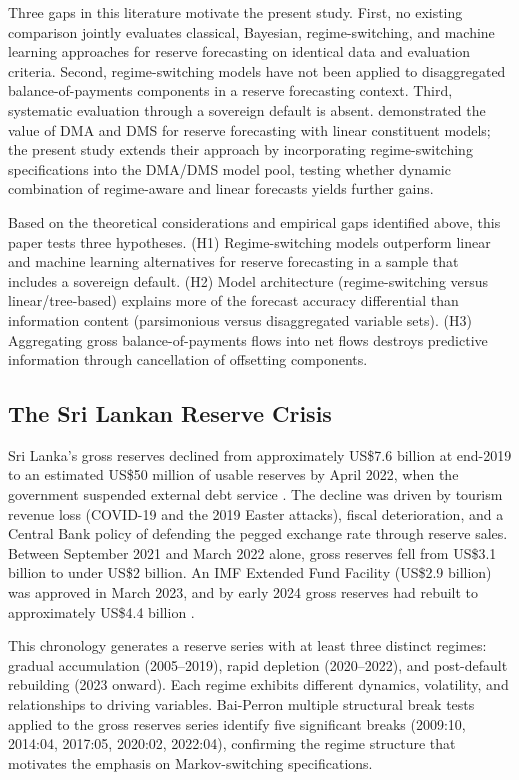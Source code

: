 \documentclass[12pt,a4paper]{article}
\begin{document}
Three gaps in this literature motivate the present study. First, no existing comparison jointly evaluates classical, Bayesian, regime-switching, and machine learning approaches for reserve forecasting on identical data and evaluation criteria. Second, regime-switching models have not been applied to disaggregated balance-of-payments components in a reserve forecasting context. Third, systematic evaluation through a sovereign default is absent. \cite{Gupta2014} demonstrated the value of DMA and DMS for reserve forecasting with linear constituent models; the present study extends their approach by incorporating regime-switching specifications into the DMA/DMS model pool, testing whether dynamic combination of regime-aware and linear forecasts yields further gains.

Based on the theoretical considerations and empirical gaps identified above, this paper tests three hypotheses. (H1) Regime-switching models outperform linear and machine learning alternatives for reserve forecasting in a sample that includes a sovereign default. (H2) Model architecture (regime-switching versus linear/tree-based) explains more of the forecast accuracy differential than information content (parsimonious versus disaggregated variable sets). (H3) Aggregating gross balance-of-payments flows into net flows destroys predictive information through cancellation of offsetting components.

\subsection{The Sri Lankan Reserve Crisis}

Sri Lanka's gross reserves declined from approximately US\$7.6 billion at end-2019 to an estimated US\$50 million of usable reserves by April 2022, when the government suspended external debt service \citep{Athukorala2024}. The decline was driven by tourism revenue loss (COVID-19 and the 2019 Easter attacks), fiscal deterioration, and a Central Bank policy of defending the pegged exchange rate through reserve sales. Between September 2021 and March 2022 alone, gross reserves fell from US\$3.1 billion to under US\$2 billion. An IMF Extended Fund Facility (US\$2.9 billion) was approved in March 2023, and by early 2024 gross reserves had rebuilt to approximately US\$4.4 billion \citep{Weerakoon2023,UNDP2022}.

This chronology generates a reserve series with at least three distinct regimes: gradual accumulation (2005--2019), rapid depletion (2020--2022), and post-default rebuilding (2023 onward). Each regime exhibits different dynamics, volatility, and relationships to driving variables. Bai-Perron multiple structural break tests applied to the gross reserves series identify five significant breaks (2009:10, 2014:04, 2017:05, 2020:02, 2022:04), confirming the regime structure that motivates the emphasis on Markov-switching specifications.
\end{document}
